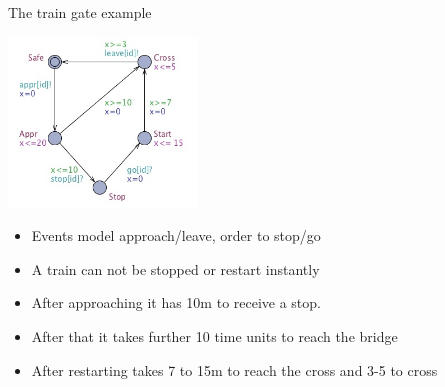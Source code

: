\documentclass{beamer}
\def\dgold#1{{\darkgoldenrod #1}}
\def\uppaal{\textsc{Uppaal}}
\begin{document}
%
%
%
%
%
%
\begin{slide}{The train gate example}
\small

\begin{center}
\includegraphics[width=5cm]{./images/tg1.jpg} 
\end{center}

\begin{itemize}
\item Events model approach/leave, order to stop/go
\item A train can not be stopped or restart instantly
\item After approaching  it has 10m to receive a stop. 
\item After that it  takes further 10 time units to reach the bridge
\item After restarting takes 7 to 15m to reach the cross and 3-5 to cross
\end{itemize}

\end{slide}
\end{document}
